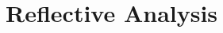 \documentclass[harvard]{lincolncsuthesis}
\begin{document}
\chapter{Reflective Analysis}






\printReferences
%
\end{document}
